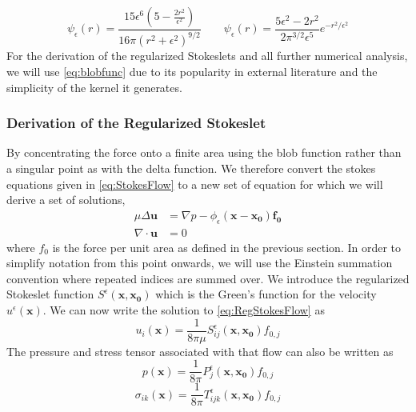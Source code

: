 \begin{equation}
\label{eq:blobfunc2}
    \psi_{\epsilon}(r)=\frac{15 \epsilon^{6}\left(5-\frac{2 r^{2}}{\epsilon^{2}}\right)}{16 \pi\left(r^{2}+\epsilon^{2}\right)^{9 / 2}} \quad\quad \psi_{\epsilon}(r)=\frac{5 \epsilon^{2}-2 r^{2}}{2 \pi^{3 / 2} \epsilon^{5}} e^{-r^{2} / \epsilon^{2}}
\end{equation}
For the derivation of the regularized Stokeslets and all further numerical analysis, we will use \cref{eq:blobfunc} due to its popularity in external literature and the simplicity of the kernel it generates.

\subsubsection{Derivation of the Regularized Stokeslet}
By concentrating the force onto a finite area using the blob function rather than a singular point as with the delta function. We therefore convert the stokes equations given in \cref{eq:StokesFlow} to a new set of equation for which we will derive a set of solutions,
\begin{subequations}
\label{eq:RegStokesFlow}
\begin{align}
    \mu\Delta\boldsymbol{u} &= \nabla p - \phi_{\epsilon}(\mathbf{x}-\mathbf{x_0})\mathbf{f_0} \label{eq:RegStokesFlow1} \\
    \nabla \cdot \boldsymbol{u} &= 0 \label{eq:RegStokesFlow2}
\end{align}
\end{subequations}
where $f_0$ is the force per unit area as defined in the previous section.
In order to simplify notation from this point onwards, we will use the Einstein summation convention where repeated indices are summed over. We introduce the regularized Stokeslet function $S^\epsilon(\mathbf{x},\mathbf{x_0})$ which is the Green's function for the velocity $u^\epsilon(\mathbf{x})$. We can now write the solution to \cref{eq:RegStokesFlow} as
\begin{equation}
\label{eq:regvelsol}
    u_i(\mathbf{x}) = \frac{1}{8\pi\mu}S^\epsilon_{ij}(\mathbf{x},\mathbf{x_0})f_{0,j}
\end{equation}
The pressure and stress tensor associated with that flow can also be written as
\begin{equation}
\label{eq:regpressuresol}
    p(\mathbf{x}) = \frac{1}{8\pi}P^\epsilon_{j}(\mathbf{x},\mathbf{x_0})f_{0,j}
\end{equation}
\begin{equation}
\label{eq:regstresssol}
    \sigma_{ik}(\mathbf{x}) = \frac{1}{8\pi}T^\epsilon_{ijk}(\mathbf{x},\mathbf{x_0})f_{0,j}
\end{equation}
